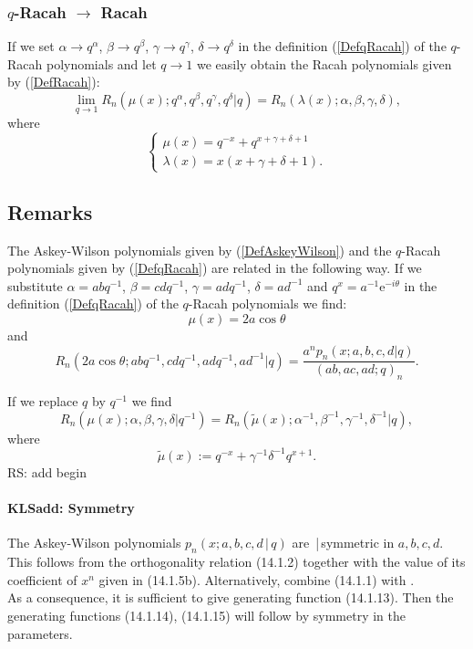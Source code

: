 \documentclass[envcountchap,graybox]{svmono}
\newcounter{rom}
\newcommand{\e}{\textrm{e}}
\newcommand\sa{\smallskipamount}
\newcommand\sLP{\\[\sa]}
\begin{document}
\subsubsection*{$q$-Racah $\rightarrow$ Racah}
If we set $\alpha\rightarrow q^{\alpha}$, $\beta\rightarrow q^{\beta}$, $\gamma\rightarrow q^{\gamma}$,
$\delta\rightarrow q^{\delta}$ in the definition (\ref{DefqRacah}) of the $q$-Racah polynomials
and let $q\rightarrow 1$ we easily obtain the Racah polynomials given by (\ref{DefRacah}):
\begin{equation}
\lim_{q\rightarrow 1}R_n(\mu(x);q^{\alpha},q^{\beta},q^{\gamma},q^{\delta}|q)
=R_n(\lambda(x);\alpha,\beta,\gamma,\delta),
\end{equation}
where
$$\left\{\begin{array}{l}
\displaystyle\mu(x)=q^{-x}+q^{x+\gamma+\delta+1}\\[5mm]
\displaystyle\lambda(x)=x(x+\gamma+\delta+1).
\end{array}\right.$$

\subsection*{Remarks}
The Askey-Wilson polynomials given by (\ref{DefAskeyWilson}) and the $q$-Racah
polynomials given by (\ref{DefqRacah}) are related in the following way.
If we substitute $\alpha=abq^{-1}$, $\beta=cdq^{-1}$, $\gamma=adq^{-1}$,
$\delta=ad^{-1}$ and $q^x=a^{-1}\e^{-i\theta}$ in the definition
(\ref{DefqRacah}) of the $q$-Racah polynomials we find:
$$\mu(x)=2a\cos\theta$$
and
$$R_n(2a\cos\theta;abq^{-1},cdq^{-1},adq^{-1},ad^{-1}|q)
=\frac{a^np_n(x;a,b,c,d|q)}{(ab,ac,ad;q)_n}.$$

\noindent
If we replace $q$ by $q^{-1}$ we find
$$R_n(\mu(x);\alpha,\beta,\gamma,\delta|q^{-1})=R_n({\tilde\mu}(x);\alpha^{-1},\beta^{-1},\gamma^{-1},\delta^{-1}|q),$$
where
$${\tilde\mu}(x):=q^{-x}+\gamma^{-1}\delta^{-1}q^{x+1}.$$
 RS: add begin\label{sec14.1}
%
\paragraph{\large\bf KLSadd: Symmetry}The Askey-Wilson polynomials $p_n(x;a,b,c,d\,|\,q)$ are \,|\,symmetric
in $a,b,c,d$.
\sLP
This follows from the orthogonality relation (14.1.2)
together with the value of its coefficient of $x^n$ given in (14.1.5b).
Alternatively, combine (14.1.1) with .\\
As a consequence, it is sufficient to give generating function (14.1.13). Then the generating
functions (14.1.14), (14.1.15) will follow by symmetry in the parameters.
%
\end{document}
